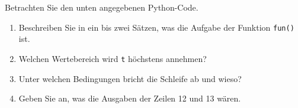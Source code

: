 Betrachten Sie den unten angegebenen Python-Code.
\begin{enumerate}
	\item Beschreiben Sie in ein bis zwei Sätzen, was die Aufgabe der Funktion \verb|fun()| ist.
	\item Welchen Wertebereich wird \verb|t| höchstens annehmen?
	\item Unter welchen Bedingungen bricht die Schleife ab und wieso?
	\item Geben Sie an, was die Ausgaben der Zeilen 12 und 13 wären.
\end{enumerate}


